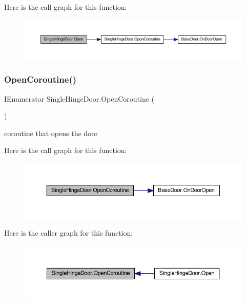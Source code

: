 Here is the call graph for this function\+:
\nopagebreak
\begin{figure}[H]
\begin{center}
\leavevmode
\includegraphics[width=350pt]{class_single_hinge_door_ad48e670701a9e9d35f97de3b8ff36208_cgraph}
\end{center}
\end{figure}
\mbox{\label{class_single_hinge_door_ae0aa0776b9f80616a0b2a35d968101ad}} 
\subsubsection{\texorpdfstring{Open\+Coroutine()}{OpenCoroutine()}}
{\footnotesize\ttfamily I\+Enumerator Single\+Hinge\+Door.\+Open\+Coroutine (\begin{DoxyParamCaption}{ }\end{DoxyParamCaption})\hspace{0.3cm}{\ttfamily [private]}}



coroutine that opens the door 

Here is the call graph for this function\+:
\nopagebreak
\begin{figure}[H]
\begin{center}
\leavevmode
\includegraphics[width=350pt]{class_single_hinge_door_ae0aa0776b9f80616a0b2a35d968101ad_cgraph}
\end{center}
\end{figure}
Here is the caller graph for this function\+:
\nopagebreak
\begin{figure}[H]
\begin{center}
\leavevmode
\includegraphics[width=350pt]{class_single_hinge_door_ae0aa0776b9f80616a0b2a35d968101ad_icgraph}
\end{center}
\end{figure}
\mbox{\label{class_single_hinge_door_a66856e16ddf504f379a4ee5601f295c6}} 
